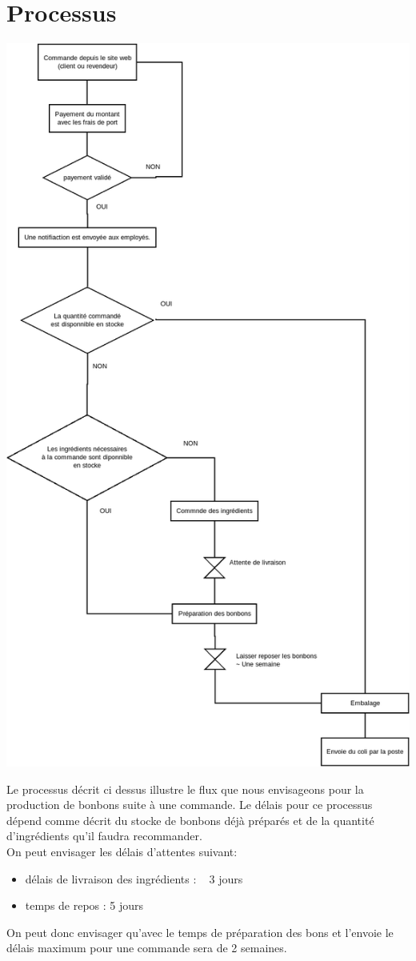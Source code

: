 \documentclass[12pt]{article}
\begin{document}
\section{Processus}
\includegraphics[scale=0.4]{../processus_de_commande.png} 

Le processus décrit ci dessus illustre le flux que nous envisageons pour la production de bonbons suite à une commande. Le délais pour ce processus dépend comme décrit du stocke de bonbons déjà préparés et de la quantité d'ingrédients qu'il faudra recommander.\\
On peut envisager les délais d'attentes suivant:\\
\begin{itemize}
\item délais de livraison des ingrédients : ~ 3 jours
\item temps de repos :  5 jours
\end{itemize}
On peut donc envisager qu'avec le temps de préparation des bons et l'envoie le délais maximum pour une commande sera de 2 semaines.
\end{document}
